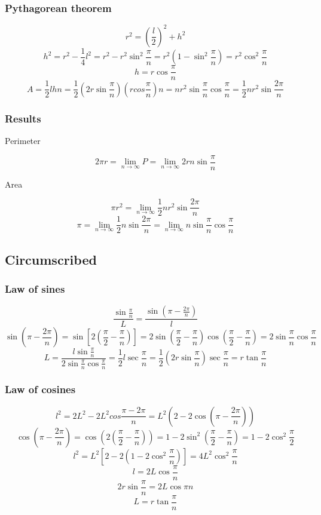 \documentclass{article}
\begin{document}
\subsubsection{Pythagorean theorem}

$$r^2 = \left(\frac{l}{2}\right)^2 + h^2$$
$$h^2 = r^2 - \frac{1}{4}l^2
= r^2 - r^2\sin^2\frac{\pi}{n}
= r^2\left(1 - \sin^2\frac{\pi}{n}\right)
= r^2\cos^2\frac{\pi}{n}$$
$$h = r\cos\frac{\pi}{n}$$
$$A = \frac{1}{2}lhn
= \frac{1}{2}\left(2r\sin\frac{\pi}{n}\right)\left(rcos\frac{\pi}{n}\right)n
= nr^2\sin\frac{\pi}{n}\cos\frac{\pi}{n}
= \frac{1}{2}nr^2\sin\frac{2\pi}{n}$$

\subsubsection{Results}

Perimeter

$$2\pi{r} = \lim_{n\to\infty} P
= \lim_{n\to\infty} 2rn\sin\frac{\pi}{n}$$

Area

$$\pi{r^2} = \lim_{n\to\infty} \frac{1}{2}nr^2\sin\frac{2\pi}{n}$$
$$\pi = \lim_{n\to\infty} \frac{1}{2}n\sin\frac{2\pi}{n}
= \lim_{n\to\infty} n\sin\frac{\pi}{n}\cos\frac{\pi}{n}$$

\subsection{Circumscribed}

\subsubsection{Law of sines}

$$\frac{\sin\frac{\pi}{n}}{L} = \frac{\sin\left(\pi - \frac{2\pi}{n}\right)}{l}$$
$$\sin\left(\pi - \frac{2\pi}{n}\right) = \sin\left[2\left(\frac{\pi}{2} - \frac{\pi}{n}\right)\right]
= 2\sin\left(\frac{\pi}{2} - \frac{\pi}{n}\right)\cos\left(\frac{\pi}{2} - \frac{\pi}{n}\right)
= 2\sin\frac{\pi}{n}\cos\frac{\pi}{n}$$
$$L = \frac{l\sin\frac{\pi}{n}}{2\sin\frac{\pi}{n}\cos\frac{\pi}{n}}
= \frac{1}{2}l\sec\frac{\pi}{n}
= \frac{1}{2}\left(2r\sin\frac{\pi}{n}\right)\sec\frac{\pi}{n}
= r\tan\frac{\pi}{n}$$

\subsubsection{Law of cosines}

$$l^2 = 2L^2 - 2L^2cos\frac{\pi - 2\pi}{n}
= L^2\left(2 - 2\cos\left(\pi - \frac{2\pi}{n}\right)\right)$$
$$\cos\left(\pi - \frac{2\pi}{n}\right) = \cos\left(2\left(\frac{\pi}{2} - \frac{\pi}{n}\right)\right)
= 1 - 2\sin^2\left(\frac{\pi}{2} - \frac{\pi}{n}\right)
= 1 - 2\cos^2\frac{\pi}{2}$$
$$l^2 = L^2\left[2 - 2\left(1 - 2\cos^2\frac{\pi}{n}\right)\right]
= 4L^2\cos^2\frac{\pi}{n}$$
$$l = 2L\cos\frac{\pi}{n}$$
$$2r\sin\frac{\pi}{n} = 2L\cos{\pi}{n}$$
$$L = r\tan\frac{\pi}{n}$$
\end{document}
